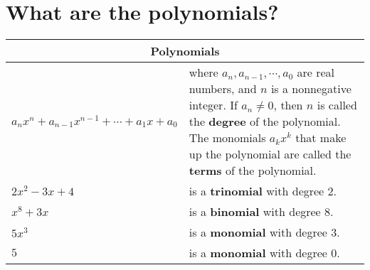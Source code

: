 \section{What are the polynomials?}
\begin{small}
    \begin{tabularx}{1\textwidth}{
            p{}
            p{}
        }

        \toprule
        \multicolumn{2}{c}{\textbf{Polynomials}} \\
        \midrule

        $ a_nx^n + a_{n-1}x^{n-1} + \cdots + a_1x + a_0 $ 
        & where $a_n, a_{n-1}, \cdots, a_0$ are real numbers, and $n$ is a
        nonnegative integer. If $a_n \neq 0$, then $n$ is called the \textbf{degree} of
        the polynomial. The monomials $a_k x^k$ that make up the polynomial are
        called the \textbf{terms} of the polynomial.
        \\
        \midrule

        $2x^2 - 3x + 4$
        &
        is a \textbf{trinomial} with degree $2$.
        \\
        \midrule

        $x^8 + 3x$
        &
        is a \textbf{binomial} with degree $8$.
        \\
        \midrule

        $5x^3$
        &
        is a \textbf{monomial} with degree $3$.
        \\
        \midrule

        $5$
        &
        is a \textbf{monomial} with degree $0$.
        \\
        \bottomrule
    \end{tabularx}
\end{small}
